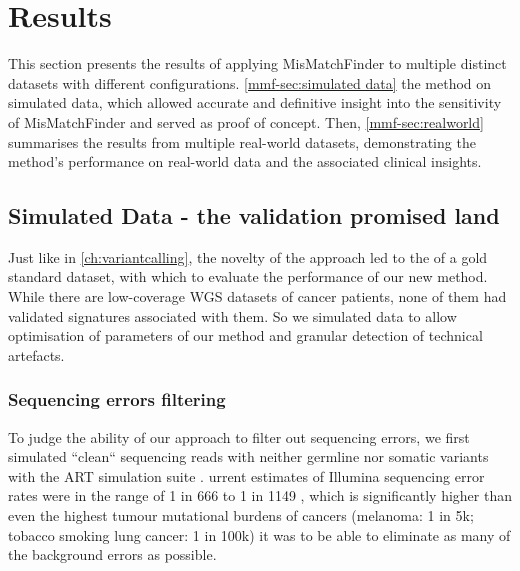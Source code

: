 
\section{Results}
\label{mmf-sec:results}
This section presents the results of applying MisMatchFinder to multiple distinct datasets with different configurations.  \autoref{mmf-sec:simulated data}  the method on simulated data, which allowed accurate and definitive insight into the sensitivity of MisMatchFinder and served as proof of concept. Then, \autoref{mmf-sec:realworld} summarises the results from multiple real-world datasets, demonstrating the method's performance on real-world data and the associated clinical insights.

\subsection{Simulated Data - the validation promised land}
\label{mmf-sec:simulated data}
Just like in \autoref{ch:variantcalling}, the novelty of the approach led to the  of a gold standard dataset, with which to evaluate the performance of our new method. While there are low-coverage WGS datasets of cancer patients, none of them had validated signatures associated with them. So we simulated data to allow  optimisation of parameters of our method and granular detection of technical artefacts. 

\subsubsection{Sequencing errors filtering}
\label{mmf-sec:cleanSim}
To judge the ability of our approach to filter out sequencing errors, we first simulated ``clean`` sequencing reads with neither germline nor somatic variants with the ART simulation suite \cite{Huang2011}. urrent estimates of Illumina sequencing error rates were in the range of 1 in 666 to 1 in 1149 \cite{Stoler2021}, which is significantly higher than even the highest tumour mutational burdens of  cancers (melanoma: 1 in 5k; tobacco smoking lung cancer: 1 in 100k) it was  to be able to eliminate as many of the background errors as possible.

